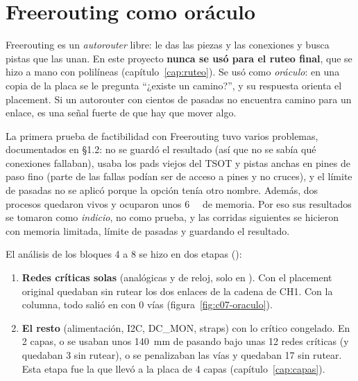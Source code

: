\section{Freerouting como oráculo}\label{sec:c07-oraculo}

Freerouting es un \emph{autorouter} libre: le das las piezas y las conexiones y busca pistas que las unan. En este
proyecto \textbf{nunca se usó para el ruteo final}, que se hizo a mano con polilíneas (capítulo~\ref{cap:ruteo}). Se
usó como \emph{oráculo}: en una copia de la placa se le pregunta ``¿existe un camino?'', y su respuesta orienta el
placement. Si un autorouter con cientos de pasadas no encuentra camino para un enlace, es una señal fuerte de que
hay que mover algo.

\begin{ojo}
La primera prueba de factibilidad con Freerouting tuvo varios problemas, documentados en 
§1.2: no se guardó el resultado (así que no se sabía qué conexiones fallaban), usaba los pads viejos del TSOT y
pistas anchas en pines de paso fino (parte de las fallas podían ser de acceso a pines y no cruces), y el límite de
pasadas no se aplicó porque la opción tenía otro nombre. Además, dos procesos quedaron vivos y ocuparon unos
\SI{6}{\giga\byte} de memoria. Por eso sus resultados se tomaron como \emph{indicio}, no como prueba, y las corridas
siguientes se hicieron con memoria limitada, límite de pasadas y guardando el resultado.
\end{ojo}

El análisis de los bloques 4 a 8 se hizo en dos etapas ():
\begin{enumerate}
  \item \textbf{Redes críticas solas} (analógicas y de reloj, solo en ). Con el placement original
        quedaban sin rutear los dos enlaces de la cadena de CH1. Con la columna, todo salió en  con 0
        vías (figura~\ref{fig:c07-oraculo}).
  \item \textbf{El resto} (alimentación, I2C, DC\_MON, straps) con lo crítico congelado. En 2 capas, o se usaban
        unos \SI{140}{\milli\meter} de  pasando bajo unas 12 redes críticas (y quedaban 3 sin rutear), o
        se penalizaban las vías y quedaban 17 sin rutear. Esta etapa fue la que llevó a la placa de 4 capas
        (capítulo~\ref{cap:capas}).
\end{enumerate}

